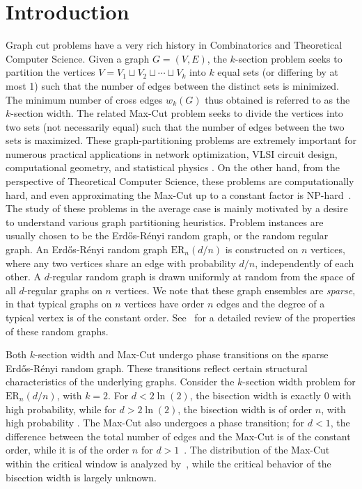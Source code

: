 \documentclass[11pt,a4paper, reqno]{article}
\numberwithin{equation}{section}
\numberwithin{equation}{section}
\newcommand{\1}{\ensuremath{\mathbbm{1}}}
\numberwithin{equation}{section}
\numberwithin{theorem}{section}
\begin{document}
\section{Introduction} 
Graph cut problems have a very rich history in Combinatorics and Theoretical Computer Science. 
Given a graph $G= (V,E)$, the $k$-section problem seeks to partition the vertices $V= V_1 \sqcup V_2 \sqcup \cdots \sqcup V_k$ into $k$ equal sets (or differing by at most 1) such that the number of edges between the distinct sets is minimized. 
The minimum number of cross edges $w_k(G)$ thus obtained is referred to as the $k$-section  width.
The related Max-Cut problem seeks to divide the vertices into two sets (not necessarily equal) such that the number of edges between the two sets is maximized. 
{These graph-partitioning problems are extremely important for numerous practical applications  in network optimization, VLSI circuit design, computational geometry, and statistical physics \cite{CKC83,CD87,HM02,MPV87,JS93,poljak1995tuza, diazpetitserna}.} On the other hand, from the perspective of Theoretical Computer Science, these problems are computationally hard, and even approximating the Max-Cut up to a constant factor is NP-hard~\cite{FK02, K04, HZ01,H01}. 
%
The study of these problems in the average case is mainly motivated by a desire to understand various graph partitioning heuristics. 
Problem instances are usually chosen to be the Erd\H{o}s-R\'enyi random graph, or the random regular graph. 
An  Erd\H{o}s-R\'enyi random graph $\mathrm{ER}_n(d/n)$ is constructed on $n$ vertices, where any two vertices share an edge with probability $d/n$, independently of each other. 
A $d$-regular random graph is drawn uniformly at random from the space of all $d$-regular graphs on $n$ vertices. 
We note that these graph ensembles are \emph{sparse}, in that typical graphs on $n$ vertices have order $n$ edges and the degree of a typical vertex is of the constant order. 
{See~\cite{bollobas,RGCN1,RGCN2,JLR00}} for a detailed review of the properties of these random graphs.

Both $k$-section width and Max-Cut undergo phase transitions on the sparse Erd\H{o}s-R\'enyi random graph. 
These transitions reflect certain structural characteristics of the underlying graphs. 
Consider the $k$-section width problem for $\mathrm{ER}_n(d/n)$, with $k=2$. 
For $d< 2\ln (2)$, the bisection width is exactly $0$ with high probability, while for $d > 2 \ln( 2)$, the bisection width is of order $n$, with high probability \cite{LM01}. 
The Max-Cut also undergoes a phase transition;
 for $d<1$, the difference between the total number of edges and the Max-Cut is of the constant order, while it is of the order $n$ for $d>1$~\cite{CGHS04}. 
The distribution of the Max-Cut within the critical window is analyzed by~\citet{DMRR12}, while the critical behavior of the bisection width is largely unknown.
\end{document}
